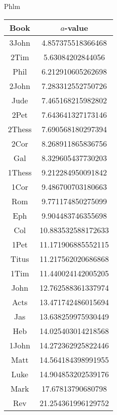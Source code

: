 \documentclass[12pt,letterpaper]{article}
\begin{document}
Phlm
\begin{longtable}{|c|c|}
\hline
 Book & $a$-value \\ \hline
3John & 4.857375518366468 \\ \hline
 2Tim & 5.63084202844056 \\ \hline
 Phil & 6.212910605262698 \\ \hline
 2John & 7.283312552750726 \\ \hline
 Jude & 7.465168215982802 \\ \hline
 2Pet & 7.643641327173146 \\ \hline
 2Thess & 7.690568180297394 \\ \hline
 2Cor & 8.268911865836756 \\ \hline
 Gal & 8.329605437730203 \\ \hline
 1Thess & 9.212284950091842 \\ \hline
 1Cor & 9.486700703180663 \\ \hline
 Rom & 9.771174850275099 \\ \hline
 Eph & 9.904483746355698 \\ \hline
 Col & 10.883532588172633 \\ \hline
 1Pet & 11.171906885552115 \\ \hline
 Titus & 11.217562020686868 \\ \hline
 1Tim & 11.440024142005205 \\ \hline
 John & 12.762588361337974 \\ \hline
 Acts & 13.471742486015694 \\ \hline
 Jas & 13.638259975930449 \\ \hline
 Heb & 14.025403014218568 \\ \hline
 1John & 14.272362925822446 \\ \hline
 Matt & 14.564184398991955 \\ \hline
 Luke & 14.904853202539176 \\ \hline
 Mark & 17.67813790680798 \\ \hline
 Rev & 21.254361996129752 \\ \hline 
\end{longtable}
\end{document}
